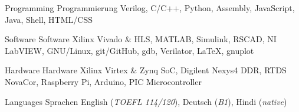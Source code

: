 \begin{cvskills}

\cvskill
	{Programming {\acvHeaderIconSep{}} {}} %
	{Programmierung {\acvHeaderIconSep{}} {}} %
	{Verilog, C/C++, Python, Assembly, JavaScript, Java, Shell, HTML/CSS} %

\cvskill
	{Software {\acvHeaderIconSep{}} {}} %
	{Software {\acvHeaderIconSep{}} {}} %
	{Xilinx Vivado \& HLS, MATLAB, Simulink, RSCAD, NI LabVIEW, GNU/Linux, git/GitHub, gdb, Verilator, \LaTeX, gnuplot} %

\cvskill
	{Hardware {\acvHeaderIconSep{}} {}} %
	{Hardware {\acvHeaderIconSep{}} {}} %
	{Xilinx Virtex \& Zynq SoC, Digilent Nexys4 DDR, RTDS NovaCor, Raspberry Pi, Arduino, PIC Microcontroller} %

\cvskill
	{Languages {\acvHeaderIconSep{}} {}} %
	{Sprachen {\acvHeaderIconSep{}} {}} %
	{English (\textit{TOEFL 114/120}), Deutsch (\textit{B1}), Hindi (\textit{native})} %

\end{cvskills}
